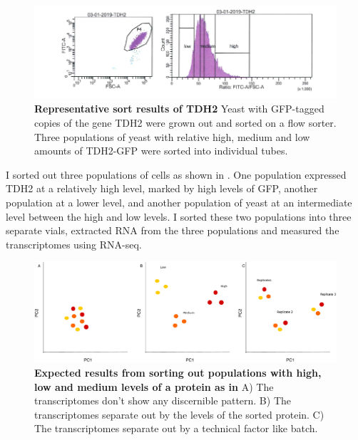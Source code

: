 \begin{figure}[t!]  
    \centering
    \includegraphics[width=\linewidth]{figures/intro/intro_tdh2_facs.png}
    \caption[Representative sort results of TDH2]{%
        \textbf{Representative sort results of TDH2}
        Yeast with GFP-tagged copies of the gene TDH2 were grown out and sorted on a flow sorter. Three populations of yeast with relative high, medium and low amounts of TDH2-GFP were sorted into individual tubes.
    }
    \label{fig:intro3}
\end{figure}

I sorted out three populations of cells as shown in . One population expressed TDH2 at a relatively high level, marked by high levels of GFP, another population at a lower level, and another population of yeast at an intermediate level between the high and low levels.  I sorted these two populations into three separate vials, extracted RNA from the three populations and measured the transcriptomes using RNA-seq.

\begin{figure}[t!]  
    \centering
    \includegraphics[width=\linewidth, scale=0.5]{figures/intro/intro_clustering_expectedresults.pdf}
    \caption[Expected results from sorting out populations with high, low and medium levels of a protein as in ]{%
        \textbf{Expected results from sorting out populations with high, low and medium levels of a protein as in }
        A) The transcriptomes don't show any discernible pattern. B) The transcriptomes separate out by the levels of the sorted protein. C) The transcriptomes separate out by a technical factor like batch.
    }
    \label{fig:intro4}
\end{figure}

